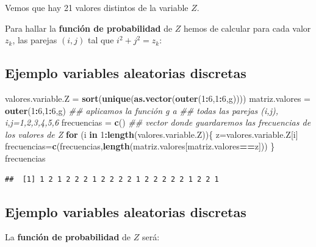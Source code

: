 \documentclass[]{book}
\newenvironment{Shaded}{\begin{snugshade}}{\end{snugshade}}
\newcommand{\CommentTok}[1]{\textcolor[rgb]{0.56,0.35,0.01}{\textit{#1}}}
\newcommand{\ControlFlowTok}[1]{\textcolor[rgb]{0.13,0.29,0.53}{\textbf{#1}}}
\newcommand{\DecValTok}[1]{\textcolor[rgb]{0.00,0.00,0.81}{#1}}
\newcommand{\KeywordTok}[1]{\textcolor[rgb]{0.13,0.29,0.53}{\textbf{#1}}}
\newcommand{\NormalTok}[1]{#1}
\newcommand{\OperatorTok}[1]{\textcolor[rgb]{0.81,0.36,0.00}{\textbf{#1}}}
\newcommand{\StringTok}[1]{\textcolor[rgb]{0.31,0.60,0.02}{#1}}
\begin{document}
Vemos que hay 21 valores distintos de la variable \(Z\).

Para hallar la \textbf{función de probabilidad} de \(Z\) hemos de calcular para cada valor \(z_k\), las parejas \((i,j)\) tal que \(i^2+j^2=z_k\):

\hypertarget{ejemplo-variables-aleatorias-discretas-2}{%
\subsection{Ejemplo variables aleatorias discretas}\label{ejemplo-variables-aleatorias-discretas-2}}

\begin{Shaded}
\begin{Highlighting}[]
\NormalTok{valores.variable.Z =}\StringTok{ }\KeywordTok{sort}\NormalTok{(}\KeywordTok{unique}\NormalTok{(}\KeywordTok{as.vector}\NormalTok{(}\KeywordTok{outer}\NormalTok{(}\DecValTok{1}\OperatorTok{:}\DecValTok{6}\NormalTok{,}\DecValTok{1}\OperatorTok{:}\DecValTok{6}\NormalTok{,g))))  }
\NormalTok{matriz.valores =}\StringTok{ }\KeywordTok{outer}\NormalTok{(}\DecValTok{1}\OperatorTok{:}\DecValTok{6}\NormalTok{,}\DecValTok{1}\OperatorTok{:}\DecValTok{6}\NormalTok{,g) }\CommentTok{## aplicamos la función g a }
\CommentTok{##  todas las parejas (i,j), i,j=1,2,3,4,5,6}
\NormalTok{frecuencias =}\StringTok{ }\KeywordTok{c}\NormalTok{()  }\CommentTok{## vector donde guardaremos las frecuencias de los valores de Z}
\ControlFlowTok{for}\NormalTok{ (i }\ControlFlowTok{in} \DecValTok{1}\OperatorTok{:}\KeywordTok{length}\NormalTok{(valores.variable.Z))\{}
\NormalTok{  z=valores.variable.Z[i]}
\NormalTok{  frecuencias=}\KeywordTok{c}\NormalTok{(frecuencias,}\KeywordTok{length}\NormalTok{(matriz.valores[matriz.valores}\OperatorTok{==}\NormalTok{z]))}
\NormalTok{\}}
\NormalTok{frecuencias}
\end{Highlighting}
\end{Shaded}

\begin{verbatim}
##  [1] 1 2 1 2 2 2 1 2 2 2 2 1 2 2 2 2 2 1 2 2 1
\end{verbatim}

\hypertarget{ejemplo-variables-aleatorias-discretas-3}{%
\subsection{Ejemplo variables aleatorias discretas}\label{ejemplo-variables-aleatorias-discretas-3}}

La \textbf{función de probabilidad} de \(Z\) será:
\end{document}
